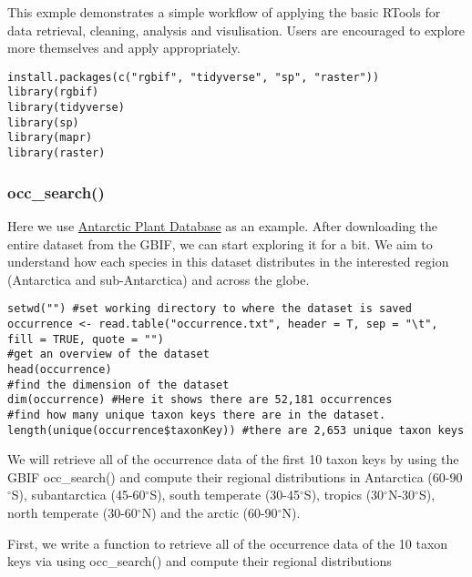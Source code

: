 \documentclass[]{article}
\begin{document}
This exmple demonstrates a simple workflow of applying the basic RTools
for data retrieval, cleaning, analysis and visulisation. Users are
encouraged to explore more themselves and apply appropriately.

\begin{verbatim}
install.packages(c("rgbif", "tidyverse", "sp", "raster"))
library(rgbif)
library(tidyverse)
library(sp)
library(mapr)
library(raster)
\end{verbatim}

\subsubsection{occ\_search()}\label{occ_search}

Here we use
\href{\%22https://www.gbif.org/dataset/82d9ff5c-f762-11e1-a439-00145eb45e9a\%22}{Antarctic
Plant Database} as an example. After downloading the entire dataset from
the GBIF, we can start exploring it for a bit. We aim to understand how
each species in this dataset distributes in the interested region
(Antarctica and sub-Antarctica) and across the globe.

\begin{verbatim}
setwd("") #set working directory to where the dataset is saved
occurrence <- read.table("occurrence.txt", header = T, sep = "\t", fill = TRUE, quote = "")
#get an overview of the dataset
head(occurrence)
#find the dimension of the dataset
dim(occurrence) #Here it shows there are 52,181 occurrences
#find how many unique taxon keys there are in the dataset. 
length(unique(occurrence$taxonKey)) #there are 2,653 unique taxon keys
\end{verbatim}

We will retrieve all of the occurrence data of the first 10 taxon keys
by using the GBIF occ\_search() and compute their regional distributions
in Antarctica (60-90\(^\circ\)S), subantarctica (45-60\(^\circ\)S),
south temperate (30-45\(^\circ\)S), tropics
(30\(^\circ\)N-30\(^\circ\)S), north temperate (30-60\(^\circ\)N) and
the arctic (60-90\(^\circ\)N).

First, we write a function to retrieve all of the occurrence data of the
10 taxon keys via using occ\_search() and compute their regional
distributions
\end{document}
